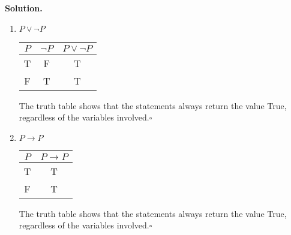 \documentclass[11pt]{article}
\begin{document}
\textbf{Solution. }
\begin{enumerate}
	\item $P \vee \neg P$
	      \begin{center}
		      \begin{tabular}{|c|c|c|}
			      \hline
			      $P$ & $\neg P$ & $P \vee \neg P$ \\
			      \hline
			      T   & F        & T               \\
			      F   & T        & T               \\
			      \hline
		      \end{tabular}
	      \end{center}
	      The truth table shows that the statements always return the value True, regardless of the variables involved.\qquad $\square$

	\item $P \rightarrow P$
	      \begin{center}
		      \begin{tabular}{|c|c|}
			      \hline
			      $P$ & $P \rightarrow P$ \\
			      \hline
			      T   & T                 \\
			      F   & T                 \\
			      \hline
		      \end{tabular}
	      \end{center}
	      The truth table shows that the statements always return the value True, regardless of the variables involved.\qquad $\square$


\end{enumerate}
\end{document}
